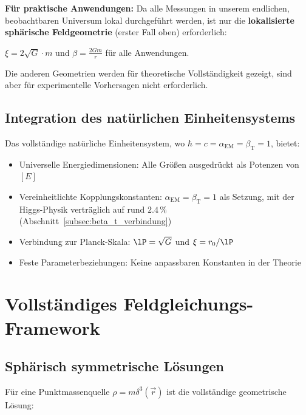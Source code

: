 	\begin{tcolorbox}[colback=yellow!5!white,colframe=orange!75!black,title=Praktische Vereinfachungsnotiz]
		\textbf{Für praktische Anwendungen:} Da alle Messungen in unserem endlichen, beobachtbaren Universum lokal durchgeführt werden, ist nur die \textbf{lokalisierte sphärische Feldgeometrie} (erster Fall oben) erforderlich:
		
		$\xi = 2\sqrt{G} \cdot m$ und $\beta = \frac{2Gm}{r}$ für alle Anwendungen.
		
		Die anderen Geometrien werden für theoretische Vollständigkeit gezeigt, sind aber für experimentelle Vorhersagen nicht erforderlich.
	\end{tcolorbox}
	
	\subsection{Integration des natürlichen Einheitensystems}
	\label{subsec:nat_einheiten_integration}
	
	Das vollständige natürliche Einheitensystem, wo $\hbar = c = \alpha_{\text{EM}} = \beta_{\text{T}} = 1$, bietet:
	\begin{itemize}
		\item Universelle Energiedimensionen: Alle Größen ausgedrückt als Potenzen von $[E]$
		\item Vereinheitlichte Kopplungskonstanten: $\alpha_{\text{EM}} = \beta_{\text{T}} = 1$ als Setzung, mit der Higgs-Physik verträglich auf rund $2.4\,\%$ (Abschnitt~\ref{subsec:beta_t_verbindung})
		\item Verbindung zur Planck-Skala: $\lP = \sqrt{G}$ und $\xi = r_0/\lP$
		\item Feste Parameterbeziehungen: Keine anpassbaren Konstanten in der Theorie
	\end{itemize}
	
	\section{Vollständiges Feldgleichungs-Framework}
	\label{sec:feldgleichungs_framework}
	
	\subsection{Sphärisch symmetrische Lösungen}
	\label{subsec:sphaerische_loesungen}
	
	Für eine Punktmassenquelle $\rho = m \delta^3(\vec{r})$ ist die vollständige geometrische Lösung:
	
